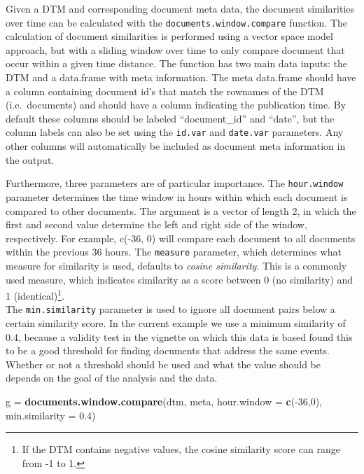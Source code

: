 \documentclass[]{article}
\newenvironment{Shaded}{\begin{snugshade}}{\end{snugshade}}
\newcommand{\KeywordTok}[1]{\textcolor[rgb]{0.13,0.29,0.53}{\textbf{{#1}}}}
\newcommand{\DataTypeTok}[1]{\textcolor[rgb]{0.13,0.29,0.53}{{#1}}}
\newcommand{\DecValTok}[1]{\textcolor[rgb]{0.00,0.00,0.81}{{#1}}}
\newcommand{\FloatTok}[1]{\textcolor[rgb]{0.00,0.00,0.81}{{#1}}}
\newcommand{\StringTok}[1]{\textcolor[rgb]{0.31,0.60,0.02}{{#1}}}
\newcommand{\NormalTok}[1]{{#1}}
\let\rmarkdownfootnote\footnote%
\def\footnote{\protect\rmarkdownfootnote}
\begin{document}
Given a DTM and corresponding document meta data, the document
similarities over time can be calculated with the
\texttt{documents.window.compare} function. The calculation of document
similarities is performed using a vector space model
\citep{salton75, salton03} approach, but with a sliding window over time
to only compare document that occur within a given time distance. The
function has two main data inputs: the DTM and a data.frame with meta
information. The meta data.frame should have a column containing
document id's that match the rownames of the DTM (i.e.~documents) and
should have a column indicating the publication time. By default these
columns should be labeled ``document\_id'' and ``date'', but the column
labels can also be set using the \texttt{id.var} and \texttt{date.var}
parameters. Any other columns will automatically be included as document
meta information in the output.

Furthermore, three parameters are of particular importance. The
\texttt{hour.window} parameter determines the time window in hours
within which each document is compared to other documents. The argument
is a vector of length 2, in which the first and second value determine
the left and right side of the window, respectively. For example, c(-36,
0) will compare each document to all documents within the previous 36
hours. The \texttt{measure} parameter, which determines what measure for
similarity is used, defaults to \emph{cosine similarity}. This is a
commonly used measure, which indicates similarity as a score between 0
(no similarity) and 1 (identical)\footnote{If the DTM contains negative
  values, the cosine similarity score can range from -1 to 1.}.\\The
\texttt{min.similarity} parameter is used to ignore all document pairs
below a certain similarity score. In the current example we use a
minimum similarity of 0.4, because a validity test in the vignette on
which this data is based found this to be a good threshold for finding
documents that address the same events. Whether or not a threshold
should be used and what the value should be depends on the goal of the
analysis and the data.

\begin{Shaded}
\begin{Highlighting}[]
\NormalTok{g =}\StringTok{ }\KeywordTok{documents.window.compare}\NormalTok{(dtm, meta,}
                             \DataTypeTok{hour.window =} \KeywordTok{c}\NormalTok{(-}\DecValTok{36}\NormalTok{,}\DecValTok{0}\NormalTok{), }
                             \DataTypeTok{min.similarity =} \FloatTok{0.4}\NormalTok{)}
\end{Highlighting}
\end{Shaded}
\end{document}
